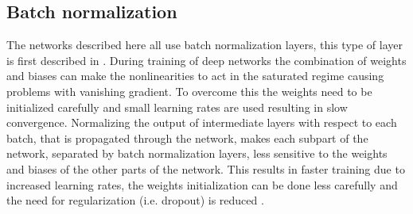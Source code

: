 \subsection{Batch normalization}\label{sec:batch_norm}
The networks described here all use batch normalization layers, this type of layer is first described in \cite{ioffe2015batch}. During training of deep networks the combination of weights and biases can make the nonlinearities to act in the saturated regime causing problems with vanishing gradient. To overcome this the weights need to be initialized carefully and small learning rates are used resulting in slow convergence. Normalizing the output of intermediate layers with respect to each batch, that is propagated through the network, makes each subpart of the network, separated by batch normalization layers, less sensitive to the weights and biases of the other parts of the network. This results in faster training due to increased learning rates, the weights initialization can be done less carefully and the need for regularization (i.e. dropout) is reduced \cite{ioffe2015batch}.


